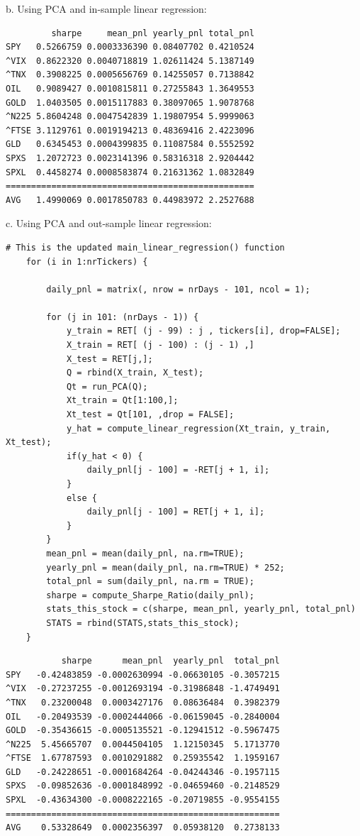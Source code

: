 \documentclass[12pt]{article}
\begin{document}
b. Using PCA and in-sample linear regression:
\begin{lstlisting}
         sharpe     mean_pnl yearly_pnl total_pnl
SPY   0.5266759 0.0003336390 0.08407702 0.4210524
^VIX  0.8622320 0.0040718819 1.02611424 5.1387149
^TNX  0.3908225 0.0005656769 0.14255057 0.7138842
OIL   0.9089427 0.0010815811 0.27255843 1.3649553
GOLD  1.0403505 0.0015117883 0.38097065 1.9078768
^N225 5.8604248 0.0047542839 1.19807954 5.9999063
^FTSE 3.1129761 0.0019194213 0.48369416 2.4223096
GLD   0.6345453 0.0004399835 0.11087584 0.5552592
SPXS  1.2072723 0.0023141396 0.58316318 2.9204442
SPXL  0.4458274 0.0008583874 0.21631362 1.0832849
=================================================
AVG   1.4990069 0.0017850783 0.44983972 2.2527688
\end{lstlisting}
\hfill \break
c. Using PCA and out-sample linear regression:
\begin{lstlisting}
# This is the updated main_linear_regression() function
	for (i in 1:nrTickers) {

		daily_pnl = matrix(, nrow = nrDays - 101, ncol = 1);

		for (j in 101: (nrDays - 1)) {
			y_train = RET[ (j - 99) : j , tickers[i], drop=FALSE];
			X_train = RET[ (j - 100) : (j - 1) ,]
			X_test = RET[j,];
			Q = rbind(X_train, X_test);
			Qt = run_PCA(Q);
			Xt_train = Qt[1:100,];
			Xt_test = Qt[101, ,drop = FALSE];
			y_hat = compute_linear_regression(Xt_train, y_train, Xt_test);
			if(y_hat < 0) {
				daily_pnl[j - 100] = -RET[j + 1, i];
			}
			else {
				daily_pnl[j - 100] = RET[j + 1, i];
			}
		}
		mean_pnl = mean(daily_pnl, na.rm=TRUE);
		yearly_pnl = mean(daily_pnl, na.rm=TRUE) * 252;
		total_pnl = sum(daily_pnl, na.rm = TRUE);
		sharpe = compute_Sharpe_Ratio(daily_pnl);
		stats_this_stock = c(sharpe, mean_pnl, yearly_pnl, total_pnl)
		STATS = rbind(STATS,stats_this_stock);
	}
\end{lstlisting}
\begin{lstlisting}
           sharpe      mean_pnl  yearly_pnl  total_pnl
SPY   -0.42483859 -0.0002630994 -0.06630105 -0.3057215
^VIX  -0.27237255 -0.0012693194 -0.31986848 -1.4749491
^TNX   0.23200048  0.0003427176  0.08636484  0.3982379
OIL   -0.20493539 -0.0002444066 -0.06159045 -0.2840004
GOLD  -0.35436615 -0.0005135521 -0.12941512 -0.5967475
^N225  5.45665707  0.0044504105  1.12150345  5.1713770
^FTSE  1.67787593  0.0010291882  0.25935542  1.1959167
GLD   -0.24228651 -0.0001684264 -0.04244346 -0.1957115
SPXS  -0.09852636 -0.0001848992 -0.04659460 -0.2148529
SPXL  -0.43634300 -0.0008222165 -0.20719855 -0.9554155
======================================================
AVG    0.53328649  0.0002356397  0.05938120  0.2738133
\end{lstlisting}
\end{document}
